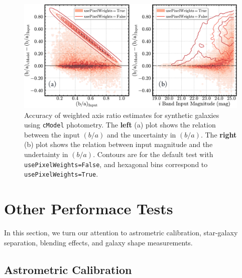 \documentclass[useamsfonts]{pasj01}
\def\synpipe{\texttt{SynPipe}}
\def\cmodel{\texttt{cModel}}
\begin{document}
\begin{figure}
    \begin{center}
        \includegraphics[width=\textwidth]{fig/synpipe_galaxy_ba}
    \end{center}
    \caption{
        Accuracy of weighted axis ratio estimates for synthetic
        galaxies using \cmodel{} photometry.
        The \textbf{left} (a) plot shows the relation between the input $(b/a)$ and the
        uncertainty in $(b/a)$.
        The \textbf{right} (b) plot shows the relation between input magnitude and the undertainty in $(b/a)$.
        Contours are for the default test with \texttt{usePixelWeights=False}, and hexagonal bins correspond to \texttt{usePixelWeights=True}.
        }
    \label{fig:galaxy_ba}
\end{figure}



\section{Other Performace Tests}
    \label{sec:others}

    In this section, we turn our attention to astrometric calibration, star-galaxy separation, blending effects, and galaxy shape measurements. 
    

\subsection{Astrometric Calibration}
    \label{ssec:astrometry}
\end{document}
